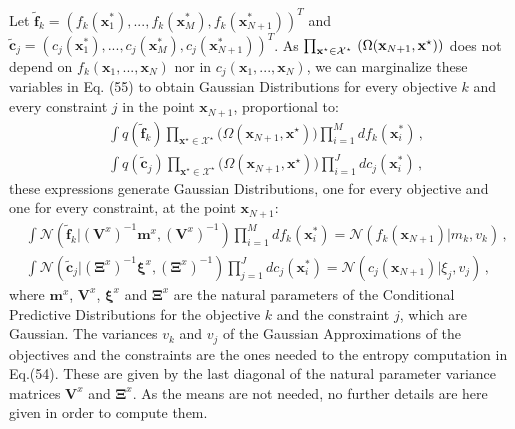 Let $\tilde{\boldsymbol{f}}_k = (f_k(\boldsymbol{x}_1^*),...,f_k(\boldsymbol{x}_M^*),f_k(\boldsymbol{x}_{N+1}^*))^T$ and $\tilde{\boldsymbol{c}}_j = (c_j(\boldsymbol{x}_1^*),...,c_j(\boldsymbol{x}_M^*),c_j(\boldsymbol{x}_{N+1}^*))^T$. As $\prod_{\textbf{x}^\star\in \mathcal{X}^\star} \\
        \left(  
        \Omega(\textbf{x}_{N+1},\textbf{x}^{\star})
        \right)$ does not depend on $f_k(\boldsymbol{x}_1,...,\boldsymbol{x}_N)$ nor in $c_j(\boldsymbol{x}_1,...,\boldsymbol{x}_N)$, we can marginalize these variables in Eq. (55) to obtain Gaussian Distributions for every objective $k$ and every constraint $j$ in the point $\boldsymbol{x}_{N+1}$, proportional to:
\begin{align}
    & \int q(\tilde{\boldsymbol{f}}_k) \prod_{\textbf{x}^\star\in \mathcal{X}^\star} 
        \Bigg( \Omega(\textbf{x}_{N+1},\textbf{x}^{\star}) \Bigg) \prod_{i=1}^{M} df_k(\boldsymbol{x}_i^*) \,, \\
        & \int q(\tilde{\boldsymbol{c}}_j) \prod_{\textbf{x}^\star\in \mathcal{X}^\star} 
        \Bigg( \Omega(\textbf{x}_{N+1},\textbf{x}^{\star}) \Bigg) \prod_{i=1}^{J} dc_j(\boldsymbol{x}_i^*) \,, 
\end{align}
these expressions generate Gaussian Distributions, one for every objective and one for every constraint, at the point $\boldsymbol{x}_{N+1}$:
\begin{align}
        & \int \mathcal{N}(\tilde{\boldsymbol{f}}_k|(\boldsymbol{V}^x)^{-1}\boldsymbol{m}^x,(\boldsymbol{V}^x)^{-1})\prod_{i=1}^{M} df_k(\boldsymbol{x}_i^*) = \mathcal{N}(f_k(\boldsymbol{x}_{N+1})|m_k,v_k)\,, \\
        & \int \mathcal{N}(\tilde{\boldsymbol{c}}_j|(\boldsymbol{\Xi}^x)^{-1}\boldsymbol{\xi}^x,(\boldsymbol{\Xi}^x)^{-1}) \prod_{j=1}^{J}  dc_j(\boldsymbol{x}_i^*) = \mathcal{N}(c_j(\boldsymbol{x}_{N+1})|\xi_j,v_j)\,,
\end{align}
where $\boldsymbol{m}^x$, $\boldsymbol{V}^x$, $\boldsymbol{\xi}^x$ and $\boldsymbol{\Xi}^x$ are the natural parameters of the Conditional Predictive Distributions for the objective $k$ and the constraint $j$, which are Gaussian. The variances $v_k$ and $v_j$ of the Gaussian Approximations of the objectives and the constraints are the ones needed to the entropy computation in Eq.(54). These are given by the last diagonal of the natural parameter variance matrices $\boldsymbol{V}^x$ and $\boldsymbol{\Xi}^x$. As the means are not needed, no further details are here given in order to compute them.

